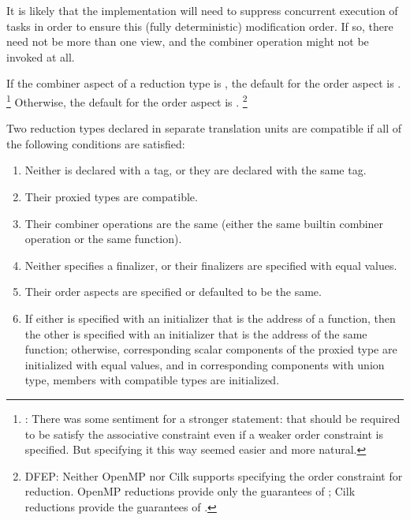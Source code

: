 \begin{description}
\begin{note}
It is likely that the implementation
will need to suppress concurrent execution of tasks
in order to ensure this (fully deterministic) modification order.
If so, there need not be more than one view,
and the combiner operation might not be invoked at all. 
\end{note}

\end{description}

\pnum
If the combiner aspect of a reduction type is
,
the default for the order aspect is
.%
\footnote{:
There was some sentiment for a stronger statement: that
should be required to be satisfy the associative constraint
even if a weaker order constraint is specified.
But specifying it this way seemed easier and more natural.
}
Otherwise, the default for the order aspect is
.
\footnote{DFEP:
Neither OpenMP nor Cilk supports specifying the order constraint for reduction.
OpenMP reductions provide only the guarantees of
;
Cilk reductions provide the guarantees of
.
}

\pnum
Two reduction types declared in separate translation units
are compatible if all of the following conditions are satisfied:

\begin{enumerate}
\item
Neither is declared with a tag, or they are declared with the same tag.
\item
Their proxied types are compatible.
\item
Their combiner operations are the same
(either the same builtin combiner operation or the same function).
\item
Neither specifies a finalizer,
or their finalizers are specified with equal values.
\item
Their order aspects are specified or defaulted to be the same.
\item
If either is specified with an initializer that is the address of a function,
then the other is specified with an initializer
that is the address of the same function;
otherwise, corresponding scalar components of the proxied type
are initialized with equal values,
and in corresponding components with union type,
members with compatible types are initialized.
\end{enumerate}


